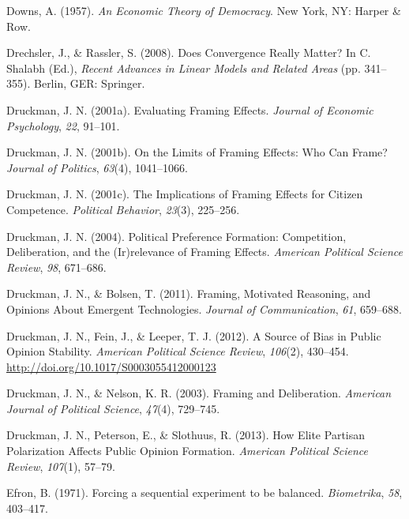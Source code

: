 \documentclass[12pt,econ]{sources/authesis}
\begin{document}
\leavevmode\hypertarget{ref-downs_economic_1957}{}%
Downs, A. (1957). \emph{An Economic Theory of Democracy}. New York, NY: Harper \& Row.

\leavevmode\hypertarget{ref-drechsler_2008_does}{}%
Drechsler, J., \& Rassler, S. (2008). Does Convergence Really Matter? In C. Shalabh (Ed.), \emph{Recent Advances in Linear Models and Related Areas} (pp. 341--355). Berlin, GER: Springer.

\leavevmode\hypertarget{ref-druckman_evaluating_2001}{}%
Druckman, J. N. (2001a). Evaluating Framing Effects. \emph{Journal of Economic Psychology}, \emph{22}, 91--101.

\leavevmode\hypertarget{ref-druckman_limits_2001}{}%
Druckman, J. N. (2001b). On the Limits of Framing Effects: Who Can Frame? \emph{Journal of Politics}, \emph{63}(4), 1041--1066.

\leavevmode\hypertarget{ref-druckman_implications_2001}{}%
Druckman, J. N. (2001c). The Implications of Framing Effects for Citizen Competence. \emph{Political Behavior}, \emph{23}(3), 225--256.

\leavevmode\hypertarget{ref-druckman_2004_political}{}%
Druckman, J. N. (2004). Political Preference Formation: Competition, Deliberation, and the (Ir)relevance of Framing Effects. \emph{American Political Science Review}, \emph{98}, 671--686.

\leavevmode\hypertarget{ref-druckman_framing_2011}{}%
Druckman, J. N., \& Bolsen, T. (2011). Framing, Motivated Reasoning, and Opinions About Emergent Technologies. \emph{Journal of Communication}, \emph{61}, 659--688.

\leavevmode\hypertarget{ref-druckman_source_2012}{}%
Druckman, J. N., Fein, J., \& Leeper, T. J. (2012). A Source of Bias in Public Opinion Stability. \emph{American Political Science Review}, \emph{106}(2), 430--454. \url{http://doi.org/10.1017/S0003055412000123}

\leavevmode\hypertarget{ref-druckman_2003_framing}{}%
Druckman, J. N., \& Nelson, K. R. (2003). Framing and Deliberation. \emph{American Journal of Political Science}, \emph{47}(4), 729--745.

\leavevmode\hypertarget{ref-druckman_how_2013}{}%
Druckman, J. N., Peterson, E., \& Slothuus, R. (2013). How Elite Partisan Polarization Affects Public Opinion Formation. \emph{American Political Science Review}, \emph{107}(1), 57--79.

\leavevmode\hypertarget{ref-efron_1971_forcing}{}%
Efron, B. (1971). Forcing a sequential experiment to be balanced. \emph{Biometrika}, \emph{58}, 403--417.
\end{document}
